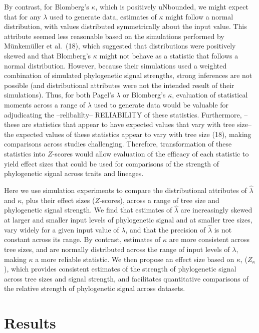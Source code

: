 \documentclass[9pt,twocolumn,twoside,lineno]{pnas-new}
\begin{document}
By contrast, for Blomberg's \(\kappa\), which is positively uNbounded,
we might expect that for any \(\lambda\) used to generate data,
estimates of \(\kappa\) might follow a normal distribution, with values
distributed symmetrically about the input value. This attribute seemed
less reasonable based on the simulations performed by Münkemüller et
al.~(18), which suggested that distributions were positively skewed and
that Blomberg's \(\kappa\) might not behave as a statistic that follows
a normal distribution. However, because their simulations used a
weighted combination of simulated phylogenetic signal strengths, strong
inferences are not possible (and distributional attributes were not the
intended result of their simulations). Thus, for both Pagel's
\(\lambda\) or Blomberg's \(\kappa\), evaluation of statistical moments
across a range of \(\lambda\) used to generate data would be valuable
for adjudicating the --relibalilty-- RELIABILITY of these statistics.
Furthermore, --these are statistics that appear to have expected values
that vary with tree size-- the expected values of these statistics
appear to vary with tree size (18), making comparisons across studies
challenging. Therefore, transformation of these statistics into
\(Z\)-scores would allow evaluation of the efficacy of each statistic to
yield effect sizes that could be used for comparisons of the strength of
phylogenetic signal across traits and lineages.

Here we use simulation experiments to compare the distributional
attributes of \(\hat{\lambda}\) and \(\kappa\), plus their effect sizes
(\(Z\)-scores), across a range of tree size and phylogenetic signal
strength. We find that estimates of \(\hat{\lambda}\) are increasingly
skewed at larger and smaller input levels of phylogenetic signal and at
smaller tree sizes, vary widely for a given input value of \(\lambda\),
and that the precision of \(\hat{\lambda}\) is not constant across its
range. By contrast, estimates of \(\kappa\) are more consistent across
tree sizes, and are normally distributed across the range of input
levels of \(\lambda\), making \(\kappa\) a more reliable statistic. We
then propose an effect size based on \(\kappa\), (\(Z_{\kappa}\)), which
provides consistent estimates of the strength of phylogenetic signal
across tree sizes and signal strength, and facilitates quantitative
comparisons of the relative strength of phylogenetic signal across
datasets.

\hypertarget{results}{%
\section{Results}\label{results}}
\end{document}
